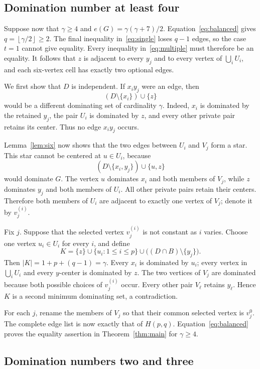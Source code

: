 \documentclass[11pt]{article}
\theoremstyle{definition}
\theoremstyle{remark}
\newcommand{\e}{e}
\newcommand{\floor}[1]{\left\lfloor#1\right\rfloor}
\begin{document}
\subsection{Domination number at least four}

Suppose now that $\gamma\ge4$ and
$\e(G)=\gamma(\gamma+7)/2$. Equation~\eqref{eq:balanced} gives
$q=\floor{\gamma/2}\ge2$. The final inequality in~\eqref{eq:single}
loses $q-1$ edges, so the case $t=1$ cannot give equality.
Every inequality in~\eqref{eq:multiple} must therefore be an equality.
It follows that $z$ is adjacent to every $y_j$ and to every vertex of
$\bigcup_iU_i$, and each six-vertex cell has exactly two optional edges.

We first show that $D$ is independent. If $x_iy_j$ were an edge, then
\[
 (D\setminus\{x_i\})\cup\{z\}
\]
would be a different dominating set of cardinality $\gamma$.
Indeed, $x_i$ is dominated by the retained $y_j$, the pair $U_i$ is
dominated by $z$, and every other private pair retains its center.
Thus no edge $x_iy_j$ occurs.

Lemma~\ref{lem:six} now shows that the two edges between $U_i$ and $V_j$
form a star. This star cannot be centered at $u\in U_i$, because
\[
 (D\setminus\{x_i,y_j\})\cup\{u,z\}
\]
would dominate $G$. The vertex $u$ dominates $x_i$ and both members of
$V_j$, while $z$ dominates $y_j$ and both members of $U_i$.
All other private pairs retain their centers. Therefore both members of
$U_i$ are adjacent to exactly one vertex of $V_j$; denote it by $v_j^{(i)}$.

Fix $j$. Suppose that the selected vertex $v_j^{(i)}$ is not constant as
$i$ varies. Choose one vertex $u_i\in U_i$ for every $i$, and define
\[
 K=\{z\}\cup\{u_i:1\le i\le p\}
       \cup\bigl((D\cap B)\setminus\{y_j\}\bigr).
\]
Then $|K|=1+p+(q-1)=\gamma$. Every $x_i$ is dominated by $u_i$;
every vertex in $\bigcup_iU_i$ and every $y$-center is dominated by $z$.
The two vertices of $V_j$ are dominated because both possible choices of
$v_j^{(i)}$ occur. Every other pair $V_\ell$ retains $y_\ell$.
Hence $K$ is a second minimum dominating set, a contradiction.

For each $j$, rename the members of $V_j$ so that their common selected
vertex is $v_j^0$. The complete edge list is now exactly that of $H(p,q)$.
Equation~\eqref{eq:balanced} proves the equality assertion in
Theorem~\ref{thm:main} for $\gamma\ge4$.

\subsection{Domination numbers two and three}
\end{document}
